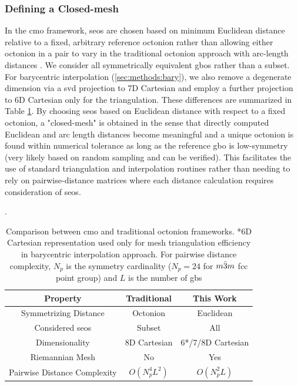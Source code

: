 \documentclass[preprint,12pt]{elsarticle}
\begin{document}
\subsubsection{Defining a Closed-mesh}
In the \gls{cmo} framework, \glspl{seo} are chosen based on minimum Euclidean distance relative to a fixed, arbitrary reference octonion rather than allowing either octonion in a pair to vary in the traditional octonion approach with arc-length distances \cite{francisGeodesicOctonionMetric2019}. We consider all symmetrically equivalent \glspl{gbo} rather than a subset. For barycentric interpolation (\ref{sec:methods:bary}), we also remove a degenerate dimension via a \gls{svd} projection to 7D Cartesian and employ a further projection to 6D Cartesian only for the triangulation. These differences are summarized in Table \ref{tab:closed-mesh-comparison}. By choosing \glspl{seo} based on Euclidean distance with respect to a fixed octonion, a "closed-mesh" is obtained in the sense that directly computed Euclidean and arc length distances become meaningful and a unique octonion is found within numerical tolerance as long as the reference \gls{gbo} is low-symmetry (very likely based on random sampling and can be verified). This facilitates the use of standard triangulation and interpolation routines rather than needing to rely on pairwise-distance matrices where each distance calculation requires consideration of \glspl{seo}.

\begin{table}[] \label{tab:closed-mesh-comparison}
\caption{Comparison between \acrlong{cmo} and traditional octonion frameworks. *6D Cartesian representation used only for mesh triangulation efficiency in barycentric interpolation approach. For pairwise distance complexity, $N_p$ is the symmetry cardinality ($N_p=24$ for $m\Bar{3}m$ \gls{fcc} point group) and $L$ is the number of \glspl{gb}}. \\
\centering
\begin{tabular}{ccc}
\hline
Property                                        & Traditional   & This Work                \\
\hline
Symmetrizing Distance                   & Octonion      & Euclidean                \\
Considered \glspl{seo}                  & Subset         & All                      \\
Dimensionality                          & 8D Cartesian  & 6*/7/8D Cartesian \\
Riemannian Mesh                         & No            & Yes                      \\
Pairwise Distance Complexity            & $O(N_p^4L^2)$ & $O(N_p^2L)$             
\end{tabular}
\end{table}
\end{document}
